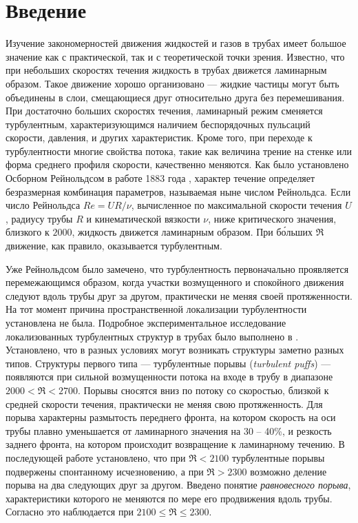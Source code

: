 \renewcommand \thechapter {i}
\thispagestyle{empty}
\phantom{.}
\chapter*{Введение}


Изучение закономерностей движения жидкостей и газов в трубах имеет большое значение как с практической, так и с теоретической точки зрения. Известно, что при небольших скоростях течения жидкость в трубах движется ламинарным образом. Такое движение хорошо организовано --- жидкие частицы могут быть объединены в слои, смещающиеся друг относительно друга без перемешивания. При достаточно больших скоростях течения, ламинарный режим сменяется турбулентным, характеризующимся наличием беспорядочных пульсаций скорости, давления, и других характеристик. Кроме того, при переходе к турбулентности многие свойства потока, такие как величина трение на стенке или форма среднего профиля скорости, качественно меняются. Как было установлено Осборном Рейнольдсом в работе 1883 года \cite{Reynolds1883}, характер течение определяет безразмерная комбинация параметров, называемая ныне числом Рейнольдса. Если число Рейнольдса $Re=UR/\nu$, вычисленное по максимальной скорости течения $U$, радиусу трубы $R$ и кинематической вязкости $\nu$, ниже критического значения, близкого к $2000$, жидкость движется ламинарным образом. При б\'{о}льших $\Re$ движение, как правило, оказывается турбулентным.

Уже Рейнольдсом было замечено, что турбулентность первоначально проявляется перемежающимся образом, когда участки возмущенного и спокойного движения следуют вдоль трубы друг за другом, практически не меняя своей протяженности. На тот момент причина пространственной локализации турбулентности установлена не была. Подробное экспериментальное исследование локализованных турбулентных структур в трубах было выполнено в \cite{Wygnanski1973}. Установлено, что в разных условиях могут возникать структуры заметно разных типов. Структуры первого типа --- турбулентные порывы ({\it turbulent puffs}) --- появляются при сильной возмущенности потока на входе в трубу в диапазоне $2000<\Re<2700$. Порывы сносятся вниз по потоку со скоростью, близкой к средней скорости течения, практически не меняя свою протяженность. Для порыва характерны размытость переднего фронта, на котором скорость на оси трубы плавно уменьшается от ламинарного значения на 30 -- 40\%, и резкость заднего фронта, на котором происходит возвращение к ламинарному течению. В последующей работе \cite{Wygnanski1975} установлено, что при $\Re<2100$ турбулентные порывы подвержены спонтанному исчезновению, а при $\Re>2300$ возможно деление порыва на два следующих друг за другом. Введено понятие {\it равновесного порыва}, характеристики которого не меняются по мере его продвижения вдоль трубы. Согласно \cite{Wygnanski1975} это наблюдается при $2100\leqslant\Re\leqslant2300$. 

